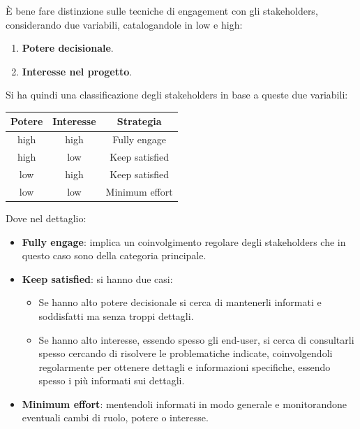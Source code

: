 È bene fare distinzione sulle tecniche di engagement con gli stakeholders,
considerando due variabili, catalogandole in low e high:
\begin{enumerate}
      \item \textbf{Potere decisionale}.
      \item \textbf{Interesse nel progetto}.
\end{enumerate}
Si ha quindi una classificazione degli stakeholders in base a queste due variabili:
\begin{table}[!ht]
      \centering
      \begin{tabular}{c|c|c}
            \textbf{Potere} & \textbf{Interesse} & \textbf{Strategia} \\\hline
            high            & high               & Fully engage       \\
            high            & low                & Keep satisfied     \\
            low             & high               & Keep satisfied     \\
            low             & low                & Minimum effort
      \end{tabular}
\end{table}
Dove nel dettaglio:
\begin{itemize}
      \item \textbf{Fully engage}: implica un coinvolgimento regolare degli
            stakeholders che in questo caso sono della categoria principale.
      \item \textbf{Keep satisfied}: si hanno due casi:
            \begin{itemize}
                  \item Se hanno alto potere decisionale si cerca di mantenerli
                        informati e soddisfatti ma senza troppi dettagli.
                  \item Se hanno alto interesse, essendo spesso gli end-user, si
                        cerca di consultarli spesso cercando di risolvere le
                        problematiche indicate, coinvolgendoli regolarmente per
                        ottenere dettagli e informazioni specifiche, essendo
                        spesso i più informati sui dettagli.
            \end{itemize}
      \item \textbf{Minimum effort}: mentendoli informati in modo generale e
            monitorandone eventuali cambi di ruolo, potere o interesse.
\end{itemize}
